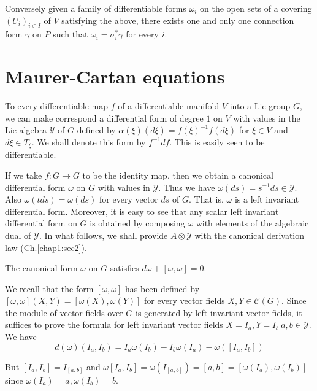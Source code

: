 Conversely given a family of differentiable forms $\omega_i$ on the
open sets of a covering $(U_i)_{i \in I}$ of $V$ satisfying the above,
there exists one and only one connection form $\gamma$ on $P$ such
that $\omega_i = \sigma_i^* \gamma$ for every $i$. 

\section{Maurer-Cartan equations}\label{chap3:sec5} %

To every differentiable map $f$ of a differentiable manifold $V$ into
a Lie group $G$, we can make correspond a differential form of degree
$1$ on $V$ with values in the Lie algebra $\mathscr{Y}$ of $G$ defined
by $\alpha (\xi) (d \xi) = f(\xi)^{-1} f(d \xi)$ for $\xi \in V$ and
$d \xi \in T_\xi$. We shall denote this form by $f^{-1} df$. This is
easily seen to be differentiable. 

If we take $f : G \rightarrow G$ to be the identity map, then we
obtain a canonical differential form $\omega$ on $G$ with values in
$\mathscr{Y}$. Thus we have $\omega (ds) = s^{-1} ds \in
\mathscr{Y}$. Also $\omega(tds) = \omega(ds)$ for every vector $ds $
of $G$. That is, $\omega$ is a left invariant differential
form. Moreover, it is easy to see that any scalar left invariant
differential form on $G$ is obtained by composing $\omega$ with
elements of the algebraic dual of $\mathscr{Y}$. In what follows, we
shall provide $A \otimes \mathscr{Y}$ with the canonical derivation
law (Ch.\ref{chap1:sec2}).

\setcounter{proposition}{0}
\begin{proposition}\label{chap3:sec5:prop1}%
  The canonical form $\omega$ on $G$ satisfies $d \omega +
  [\omega,\omega] = 0$.\pageoriginale 
\end{proposition}

We recall that the form $[\omega,\omega]$ has been defined by
$[\omega,\omega] (X,Y) = [\omega(X),\omega(Y)]$ for every vector
fields $X,Y \in \mathscr{C}(G)$. Since the module of vector fields
over $G$ is generated by left invariant vector fields, it suffices to
prove the formula for left invariant vector fields $X = I_a, Y = I_b ~
a,b \in \mathscr{Y}$. We have 
$$
d(\omega) (I_a,I_b) = I_a \omega(I_b) - I_b \omega(I_a) -
\omega([I_a,I_b]) 
$$

But $[I_a,I_b] = I_{[a,b]}$ and $\omega[I_a,I_b] = \omega(I_{[a,b]}) =
[a,b] = [\omega(I_a),\omega(I_b)]$ since $\omega(I_a) = a, \omega(I_b)
= b$. 

